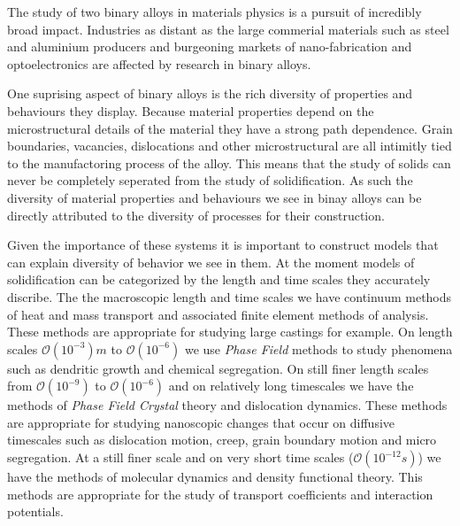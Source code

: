 \label{chapter:introduction}



The study of two binary alloys in materials physics is a pursuit of incredibly
broad impact. Industries as distant as the large commerial materials such as
steel and aluminium producers and burgeoning markets of nano-fabrication and
optoelectronics are affected by research in binary alloys.

One suprising aspect of binary alloys is the rich diversity of properties and
behaviours they display. Because material properties depend on the
microstructural details of the material they have a strong path dependence.
Grain boundaries, vacancies, dislocations and other microstructural are all
intimitly tied to the manufactoring process of the alloy. This means that the
study of solids can never be completely seperated from the study of
solidification. As such the diversity of material properties and behaviours we
see in binay alloys can be directly attributed to the diversity of processes
for their construction.

Given the importance of these systems it is important to construct models that
can explain diversity of behavior we see in them. At the moment models of
solidification can be categorized by the length and time scales they accurately
discribe. The the macroscopic length and time scales we have continuum methods
of heat and mass transport and associated finite element methods of analysis.
These methods are appropriate for studying large castings for example. On
length scales $\mathcal{O}(10^{-3})m$ to $\mathcal{O}(10^{-6})$ we use
\textit{Phase Field} methods to study phenomena such as dendritic growth and
chemical segregation. On still finer length scales from $\mathcal{O}(10^{-9})$
to $\mathcal{O}(10^{-6})$ and on relatively long timescales we have the methods
of \textit{Phase Field Crystal} theory and dislocation dynamics. These methods
are appropriate for studying nanoscopic changes that occur on diffusive
timescales such as dislocation motion, creep, grain boundary motion and micro
segregation. At a still finer scale and on very short time scales
($\mathcal{O}(10^{-12}s)$) we have the methods of molecular dynamics and
density functional theory. This methods are appropriate for the study of
transport coefficients and interaction potentials.


